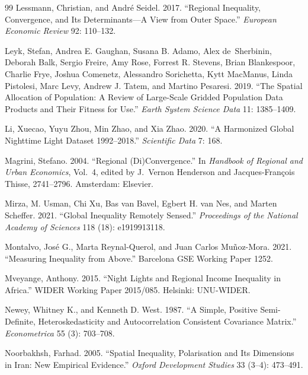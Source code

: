 \documentclass[11pt,a4paper]{article}
\begin{document}
\begin{thebibliography}{99}
Lessmann, Christian, and Andr\'e Seidel. 2017. ``Regional Inequality, Convergence, and Its Determinants---A View from Outer Space.'' \textit{European Economic Review} 92: 110--132.

Leyk, Stefan, Andrea E. Gaughan, Susana B. Adamo, Alex de~Sherbinin, Deborah Balk, Sergio Freire, Amy Rose, Forrest R. Stevens, Brian Blankespoor, Charlie Frye, Joshua Comenetz, Alessandro Sorichetta, Kytt MacManus, Linda Pistolesi, Marc Levy, Andrew J. Tatem, and Martino Pesaresi. 2019. ``The Spatial Allocation of Population: A Review of Large-Scale Gridded Population Data Products and Their Fitness for Use.'' \textit{Earth System Science Data} 11: 1385--1409.

Li, Xuecao, Yuyu Zhou, Min Zhao, and Xia Zhao. 2020. ``A Harmonized Global Nighttime Light Dataset 1992--2018.'' \textit{Scientific Data} 7: 168.

Magrini, Stefano. 2004. ``Regional (Di)Convergence.'' In \textit{Handbook of Regional and Urban Economics}, Vol.\ 4, edited by J.~Vernon Henderson and Jacques-Fran\c{c}ois Thisse, 2741--2796. Amsterdam: Elsevier.

Mirza, M. Usman, Chi Xu, Bas van Bavel, Egbert H. van Nes, and Marten Scheffer. 2021. ``Global Inequality Remotely Sensed.'' \textit{Proceedings of the National Academy of Sciences} 118 (18): e1919913118.

Montalvo, Jos\'e G., Marta Reynal-Querol, and Juan Carlos Mu\~noz-Mora. 2021. ``Measuring Inequality from Above.'' Barcelona GSE Working Paper 1252.

Mveyange, Anthony. 2015. ``Night Lights and Regional Income Inequality in Africa.'' WIDER Working Paper 2015/085. Helsinki: UNU-WIDER.

Newey, Whitney K., and Kenneth D. West. 1987. ``A Simple, Positive Semi-Definite, Heteroskedasticity and Autocorrelation Consistent Covariance Matrix.'' \textit{Econometrica} 55 (3): 703--708.

Noorbakhsh, Farhad. 2005. ``Spatial Inequality, Polarisation and Its Dimensions in Iran: New Empirical Evidence.'' \textit{Oxford Development Studies} 33 (3--4): 473--491.


\end{thebibliography}
\end{document}
